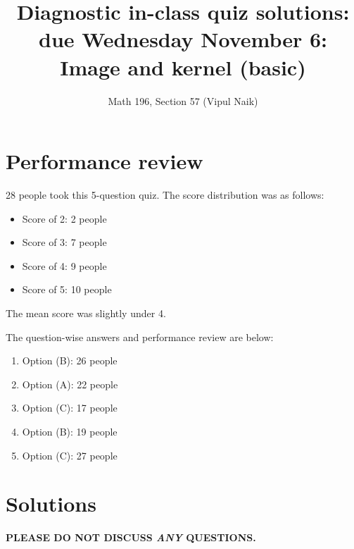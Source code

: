 \documentclass[10pt]{amsart}
\title{Diagnostic in-class quiz solutions: due Wednesday November 6: Image and kernel (basic)}
\author{Math 196, Section 57 (Vipul Naik)}
\begin{document}
\maketitle

\section{Performance review}

28 people took this 5-question quiz. The score distribution was as follows:

\begin{itemize}
\item Score of 2: 2 people
\item Score of 3: 7 people
\item Score of 4: 9 people
\item Score of 5: 10 people
\end{itemize}

The mean score was slightly under 4.

The question-wise answers and performance review are below:

\begin{enumerate}
\item Option (B): 26 people
\item Option (A): 22 people
\item Option (C): 17 people
\item Option (B): 19 people
\item Option (C): 27 people
\end{enumerate}

\section{Solutions}

{\bf PLEASE DO NOT DISCUSS {\em ANY} QUESTIONS.}
\end{document}
